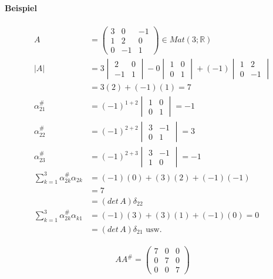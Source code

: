 \documentclass[11pt]{report}
\newcommand*\Zb[1] {\mathbb{#1}}
\begin{document}
\paragraph{Beispiel}
\begin{align}
A &= \begin{pmatrix} 3 & 0 & -1 \\ 1 & 2 & 0 \\ 0 & -1 & 1\end{pmatrix} \in Mat(3; \Zb{R}) \\
|A| &= 3 \begin{vmatrix} 2 & 0 \\ -1 & 1 \end{vmatrix} - 0 \begin{vmatrix} 1 & 0 \\ 0 & 1 \end{vmatrix} + (-1) \begin{vmatrix} 1 & 2 \\ 0 & -1 \end{vmatrix} \\
&= 3 (2) + (-1)(1) = 7 \\
\alpha_{21}^{\#} &= (-1)^{1+2} \begin{vmatrix} 1 & 0 \\ 0 & 1 \end{vmatrix} = -1 \\
\alpha_{22}^{\#} &= (-1)^{2+2} \begin{vmatrix} 3 & -1 \\ 0 & 1 \end{vmatrix} = 3 \\
\alpha_{23}^{\#} &= (-1)^{2+3} \begin{vmatrix} 3 & -1 \\ 1 & 0 \end{vmatrix} = -1 \\
\sum_{k=1}^{3} \alpha_{2k}^{\#} \alpha_{2k} &= (-1) (0) + (3)(2) + (-1)(-1) \\
&= 7 \\
&= (det\, A) \delta_{22} \\
\sum_{k=1}^{3} \alpha_{2k}^{\#} \alpha_{k1} &= (-1) (3) + (3)(1) + (-1)(0) = 0 \\
&= (det \, A) \delta_{21} \text{ usw.}
\end{align}

\begin{align}
AA^{\#} = \begin{pmatrix} 7 & 0 & 0 \\ 0 & 7 & 0 \\ 0 & 0 & 7\end{pmatrix}
\end{align}
\end{document}
